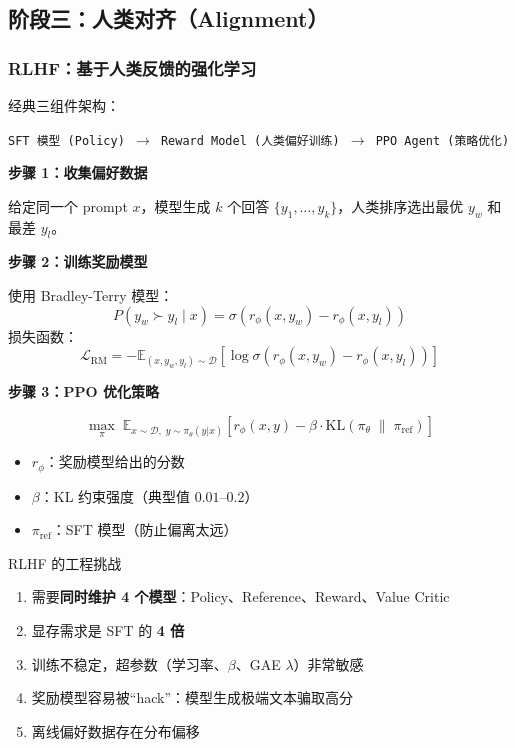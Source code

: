 \documentclass[12pt,a4paper]{article}
\begin{document}
\subsection{阶段三：人类对齐（Alignment）}

\subsubsection{RLHF：基于人类反馈的强化学习}

经典三组件架构：
\begin{center}
\texttt{SFT 模型 (Policy) $\longrightarrow$ Reward Model (人类偏好训练) $\longrightarrow$ PPO Agent (策略优化)}
\end{center}

\textbf{步骤 1：收集偏好数据}

给定同一个 prompt $x$，模型生成 $k$ 个回答 $\{y_1, \ldots, y_k\}$，人类排序选出最优 $y_w$ 和最差 $y_l$。

\textbf{步骤 2：训练奖励模型}

使用 Bradley-Terry 模型：
\[
P(y_w \succ y_l \mid x) = \sigma\!\left(r_\phi(x, y_w) - r_\phi(x, y_l)\right)
\]
损失函数：
\[
\mathcal{L}_{\text{RM}} = -\mathbb{E}_{(x, y_w, y_l) \sim \mathcal{D}} \left[ \log \sigma\!\left(r_\phi(x, y_w) - r_\phi(x, y_l)\right) \right]
\]

\textbf{步骤 3：PPO 优化策略}

\[
\max_\pi \; \mathbb{E}_{x \sim \mathcal{D},\; y \sim \pi_\theta(y|x)} \left[ r_\phi(x,y) - \beta \cdot \text{KL}\!\left(\pi_\theta \;\|\; \pi_{\text{ref}}\right) \right]
\]
\begin{itemize}
  \item $r_\phi$：奖励模型给出的分数
  \item $\beta$：KL 约束强度（典型值 $0.01\text{--}0.2$）
  \item $\pi_{\text{ref}}$：SFT 模型（防止偏离太远）
\end{itemize}

\begin{warnbox}{RLHF 的工程挑战}
\begin{enumerate}
  \item 需要\textbf{同时维护 4 个模型}：Policy、Reference、Reward、Value Critic
  \item 显存需求是 SFT 的 \textbf{4 倍}
  \item 训练不稳定，超参数（学习率、$\beta$、GAE $\lambda$）非常敏感
  \item 奖励模型容易被“hack”：模型生成极端文本骗取高分
  \item 离线偏好数据存在分布偏移
\end{enumerate}
\end{warnbox}
\end{document}
